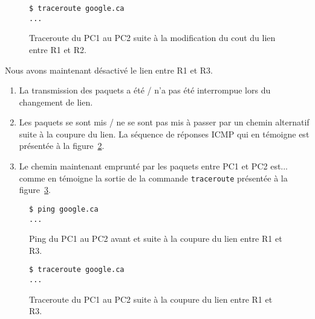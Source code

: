 \documentclass[]{article}
\begin{document}
\begin{figure}
      \centering
      \begin{lstlisting}
$ traceroute google.ca
...
      \end{lstlisting}
      \caption[]{Traceroute du PC1 au PC2 suite à la modification du cout du lien entre R1 et R2.}
      \label{fig:traceroute-pc1-pc2}
\end{figure}

Nous avons maintenant désactivé le lien entre R1 et R3.

\begin{enumerate}
      \item La transmission des paquets a été / n'a pas été interrompue lors du changement de lien.
      \item Les paquets se sont mis / ne se sont pas mis à passer par un chemin alternatif suite à la
            coupure du lien. La séquence de réponses ICMP qui en témoigne est présentée à la figure~\ref{fig:ping-pc1-pc2-coupure}.
      \item Le chemin maintenant emprunté par les paquets entre PC1 et PC2 est... comme en témoigne la sortie
            de la commande \texttt{traceroute} présentée à la figure~\ref{fig:traceroute-pc1-pc2-coupure}.
\end{enumerate}

\begin{figure}
      \centering
      \begin{lstlisting}
$ ping google.ca
...
      \end{lstlisting}
      \caption[]{Ping du PC1 au PC2 avant et suite à la coupure du lien entre R1 et R3.}
      \label{fig:ping-pc1-pc2-coupure}
\end{figure}

\begin{figure}
      \centering
      \begin{lstlisting}
$ traceroute google.ca
...
      \end{lstlisting}
      \caption[]{Traceroute du PC1 au PC2 suite à la coupure du lien entre R1 et R3.}
      \label{fig:traceroute-pc1-pc2-coupure}
\end{figure}

    
\end{document}
